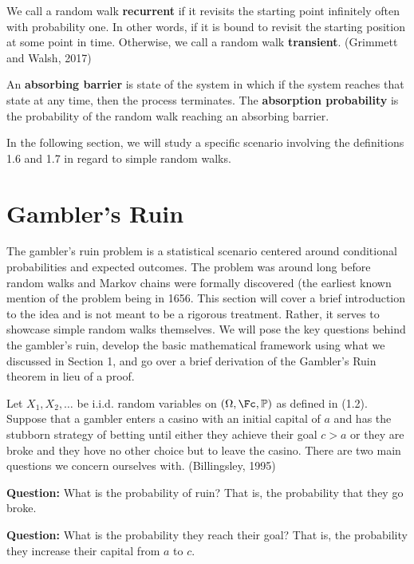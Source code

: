 \documentclass[12pt]{article}
\theoremstyle{definition}
\numberwithin{equation}{section}
\newcommand{\Pro}{\ensuremath{\mathbb{P}}}
\begin{document}
 We call a random walk \textbf{recurrent} if it revisits the starting point infinitely often with probability one. In other words, if it is bound to revisit the starting position at some point in time. Otherwise, we call a random walk \textbf{transient}. (Grimmett and Walsh, 2017)

 An \textbf{absorbing barrier} is state of the system in which if the system reaches that state at any time, then the process terminates. The \textbf{absorption probability} is the probability of the random walk reaching an absorbing barrier.

In the following section, we will study a specific scenario involving the definitions 1.6 and 1.7 in regard to simple random walks.

\pagebreak

\section{Gambler's Ruin}
The gambler's ruin problem is a statistical scenario centered around conditional probabilities and expected outcomes. The problem was around long before random walks and Markov chains were formally discovered (the earliest known mention of the problem being in 1656. This section will cover a brief introduction to the idea and is not meant to be a rigorous treatment. Rather, it serves to showcase simple random walks themselves. We will pose the key questions behind the gambler's ruin, develop the basic mathematical framework using what we discussed in Section 1, and go over a brief derivation of the Gambler's Ruin theorem in lieu of a proof.\smallskip

Let $X_1,X_2,\ldots$ be i.i.d. random variables on $(\Omega, \Fc,\Pro)$
as defined in (1.2). Suppose that a gambler enters a casino with an initial capital of $a$ and has the stubborn strategy of betting until either they achieve their goal $c > a$ or they are broke and they hove no other choice but to leave the casino. There are two main questions we concern ourselves with. (Billingsley, 1995)

\textbf{Question:} What is the probability of ruin? That is, the probability that they go broke.

\textbf{Question:} What is the probability they reach their goal? That is, the probability they increase their capital from $a$ to $c$.
\end{document}
